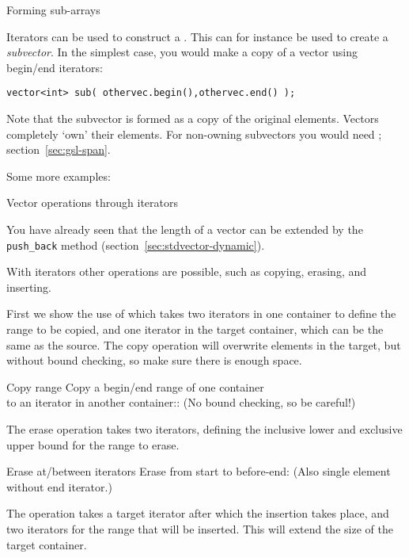  {Forming sub-arrays}

Iterators can be used to construct a . This can
for instance be used to create a
\emph{subvector}.
In the simplest case, you would make a copy
of a vector using begin/end iterators:
\begin{lstlisting}
vector<int> sub( othervec.begin(),othervec.end() );
\end{lstlisting}

Note that the subvector is formed as a copy of the original elements.
Vectors completely `own' their elements. For non-owning subvectors
you would need ; section~\ref{sec:gsl-span}.

Some more examples:
%

 {Vector operations through iterators}

You have already seen that the length of a vector can be
extended by the \lstinline+push_back+ method
(section~\ref{sec:stdvector-dynamic}).

With iterators other operations are possible,
such as copying, erasing, and inserting.

First we show the use of  which takes
two iterators in one container to define the range to be copied,
and one iterator in the target container, which can be the same as the source.
The copy operation will overwrite elements in the target,
but without bound checking, so make sure there is enough space.

\begin{block}{Copy range}
  \label{sl:iter-copy}
  Copy a begin/end range of one container\\
  to an iterator in another container::
  (No bound checking, so be careful!)
\end{block}

The erase operation  takes two iterators,
defining the inclusive lower and exclusive upper bound
for the range to erase.

\begin{block}{Erase at/between iterators}
  \label{sl:iter-erase}
  Erase from start to before-end:
  (Also single element without end iterator.)
\end{block}

The  operation takes a target iterator
after which the insertion takes place, and
two iterators for the range that will be inserted.
This will extend the size of the target container.

